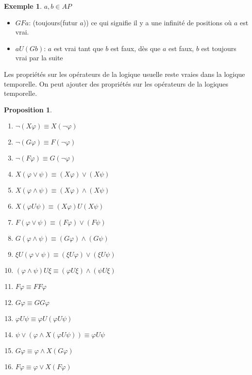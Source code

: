 \documentclass[12pt,a4paper]{article}
\theoremstyle{plain}
\newtheorem{prop}{Proposition}
\theoremstyle{definition}
\newtheorem{ex}{Exemple}
\begin{document}
\begin{ex}
	\leavevmode \newline
	$a, b \in AP$
	\begin{itemize}
		\item $GFa$: (toujours(futur $a$)) ce qui signifie il y a une infinité de positions où $a$ est vrai.
		\item $aU(Gb)$: $a$ est vrai tant que $b$ est faux, dès que $a$ est faux, $b$ est toujours vrai par la suite
	\end{itemize}
\end{ex}
Les propriétés sur les opérateurs de la logique usuelle reste vraies dans la logique temporelle. On peut ajouter des propriétés sur les opérateurs de la logiques temporelle.
\begin{prop}
	\leavevmode
	\begin{enumerate}
		\item $\lnot (X \varphi) \equiv X(\lnot \varphi)$
		\item $\lnot (G \varphi) \equiv F(\lnot \varphi)$
		\item $\lnot (F \varphi) \equiv G(\lnot \varphi)$

		\item $X (\varphi \lor \psi) \equiv (X \varphi) \lor (X \psi)$
		\item $X (\varphi \land \psi) \equiv (X \varphi) \land (X \psi)$
		\item $X (\varphi U \psi) \equiv (X \varphi) U (X \psi)$
		\item $F (\varphi \lor \psi) \equiv (F \varphi) \lor (F \psi)$
		\item $G (\varphi \land \psi) \equiv (G \varphi) \land (G \psi)$
		\item $\xi U (\varphi \lor \psi) \equiv (\xi U \varphi) \lor (\xi U \psi)$
		\item $(\varphi \land \psi) U \xi \equiv (\varphi U \xi) \land (\psi U \xi)$

		\item $F \varphi \equiv FF\varphi$
		\item $G \varphi \equiv GG\varphi$
		\item $\varphi U \psi \equiv \varphi U (\varphi U \psi)$
		\item $\psi \lor (\varphi \land X(\varphi U \psi)) \equiv \varphi U \psi$
		\item $G \varphi \equiv \varphi \land X(G \varphi)$
		\item $F \varphi \equiv \varphi \lor X(F\varphi)$
	\end{enumerate}
\end{prop}
\end{document}
